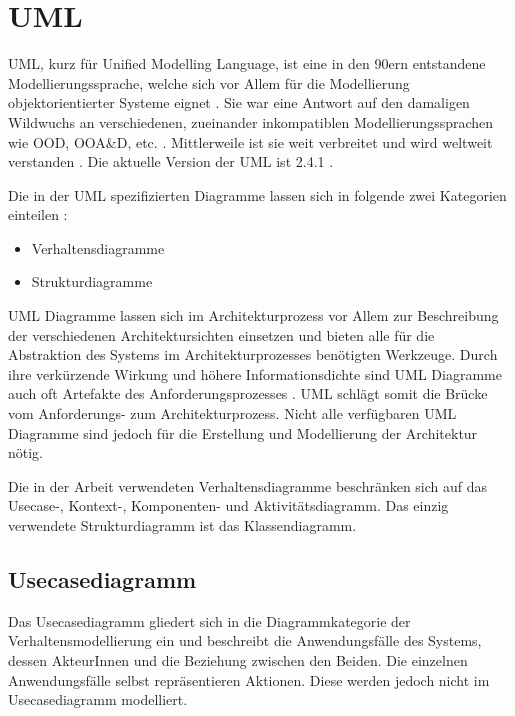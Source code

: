 \section{UML}
UML, kurz für Unified Modelling Language, ist eine in den 90ern entstandene Modellierungssprache, welche sich vor Allem für die Modellierung objektorientierter Systeme eignet \cite[S. 145]{basiswissen}. Sie war eine Antwort auf den damaligen Wildwuchs an verschiedenen, zueinander inkompatiblen Modellierungssprachen wie OOD, OOA\&D, etc. \cite[S. 5]{glasklar}. Mittlerweile ist sie weit verbreitet und wird weltweit verstanden \cite[S. 138]{effektiv}. Die aktuelle Version der UML ist 2.4.1 \cite{omg}.


Die in der UML spezifizierten Diagramme lassen sich in folgende zwei Kategorien einteilen \cite[S. 105, 239]{glasklar}\cite[S. 146]{basiswissen}:

\begin{itemize}
  \item Verhaltensdiagramme
  \item Strukturdiagramme
\end{itemize}

UML Diagramme lassen sich im Architekturprozess vor Allem zur Beschreibung der verschiedenen Architektursichten einsetzen und bieten alle für die Abstraktion des Systems im Architekturprozesses benötigten Werkzeuge\cite[S. 139]{effektiv}. Durch ihre verkürzende Wirkung und höhere Informationsdichte sind UML Diagramme auch oft Artefakte des Anforderungsprozesses \cite[S. 215]{reqman}. UML schlägt somit die Brücke vom Anforderungs- zum Architekturprozess. Nicht alle verfügbaren UML Diagramme sind jedoch für die Erstellung und Modellierung der Architektur nötig. \cite[S. 144]{basiswissen}

Die in der Arbeit verwendeten Verhaltensdiagramme beschränken sich auf das Usecase-, Kontext-, Komponenten- und Aktivitätsdiagramm. Das einzig verwendete Strukturdiagramm ist das Klassendiagramm.


\subsection{Usecasediagramm}
Das Usecasediagramm gliedert sich in die Diagrammkategorie der Verhaltensmodellierung ein und beschreibt die Anwendungsfälle des Systems, dessen AkteurInnen und die Beziehung zwischen den Beiden. Die einzelnen Anwendungsfälle selbst repräsentieren Aktionen. Diese werden jedoch nicht im Usecasediagramm modelliert.\cite[S. 242-245]{glasklar}

